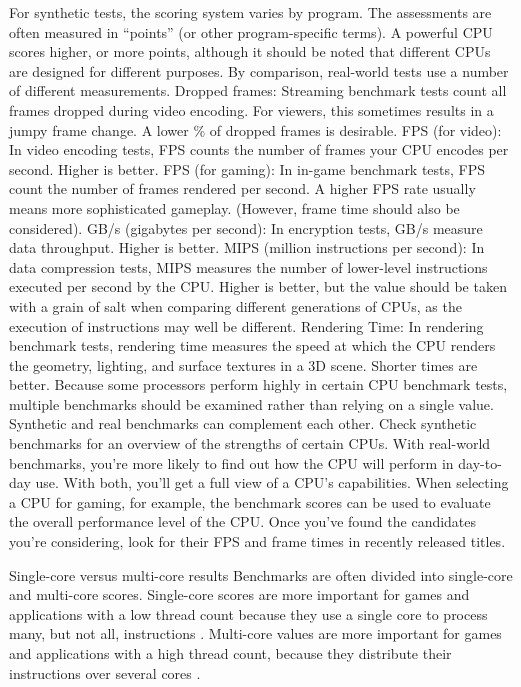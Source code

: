 For synthetic tests, the scoring system varies by program. The assessments are often measured in ``points'' (or other program-specific terms). A powerful CPU scores higher, or more points, although it should be noted that different CPUs are designed for different purposes.
By comparison, real-world tests use a number of different measurements.
Dropped frames: Streaming benchmark tests count all frames dropped during video encoding. For viewers, this sometimes results in a jumpy frame change. A lower \% of dropped frames is desirable.
FPS (for video): In video encoding tests, FPS counts the number of frames your CPU encodes per second. Higher is better.
FPS (for gaming): In in-game benchmark tests, FPS count the number of frames rendered per second. A higher FPS rate usually means more sophisticated gameplay. (However, frame time should also be considered).
GB/s (gigabytes per second): In encryption tests, GB/s measure data throughput. Higher is better.
MIPS (million instructions per second): In data compression tests, MIPS measures the number of lower-level instructions executed per second by the CPU. Higher is better, but the value should be taken with a grain of salt when comparing different generations of CPUs, as the execution of instructions may well be different.
Rendering Time: In rendering benchmark tests, rendering time measures the speed at which the CPU renders the geometry, lighting, and surface textures in a 3D scene. Shorter times are better.
Because some processors perform highly in certain CPU benchmark tests, multiple benchmarks should be examined rather than relying on a single value.
Synthetic and real benchmarks can complement each other. Check synthetic benchmarks for an overview of the strengths of certain CPUs. With real-world benchmarks, you're more likely to find out how the CPU will perform in day-to-day use. With both, you'll get a full view of a CPU's capabilities.
When selecting a CPU for gaming, for example, the benchmark scores can be used to evaluate the overall performance level of the CPU. Once you've found the candidates you're considering, look for their FPS and frame times in recently released titles.

Single-core versus multi-core results
Benchmarks are often divided into single-core and multi-core scores.
Single-core scores are more important for games and applications with a low thread count because they use a single core to process many, but not all, instructions \cite{Fromsing30:online}.
Multi-core values are more important for games and applications with a high thread count, because they distribute their instructions over several cores \cite{1110353543:online}.

